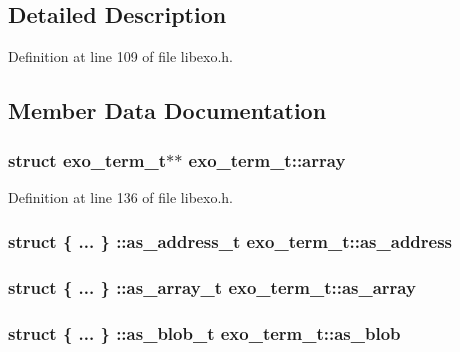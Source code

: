 \subsection{Detailed Description}


Definition at line 109 of file libexo.h.

\subsection{Member Data Documentation}
\subsubsection[{array}]{\setlength{\rightskip}{0pt plus 5cm}struct {\bf exo\_\-term\_\-t}$\ast$$\ast$ {\bf exo\_\-term\_\-t::array}\hspace{0.3cm}{\tt  [read]}}\label{structexo__term__t_72fa5918fbefc7f65970d8330f381aa9}




Definition at line 136 of file libexo.h.
\subsubsection[{as\_\-address}]{\setlength{\rightskip}{0pt plus 5cm}struct \{ ... \} ::as\_\-address\_\-t  {\bf exo\_\-term\_\-t::as\_\-address}}\label{structexo__term__t_960d6b97b673e0ff7be4c7fa39a0cb90}


\subsubsection[{as\_\-array}]{\setlength{\rightskip}{0pt plus 5cm}struct \{ ... \} ::as\_\-array\_\-t  {\bf exo\_\-term\_\-t::as\_\-array}}\label{structexo__term__t_cbc20e7fc9406199aab2db5858405ada}


\subsubsection[{as\_\-blob}]{\setlength{\rightskip}{0pt plus 5cm}struct \{ ... \} ::as\_\-blob\_\-t  {\bf exo\_\-term\_\-t::as\_\-blob}}\label{structexo__term__t_01fa13a9b8d9b6425f9ed802124ab09a}


